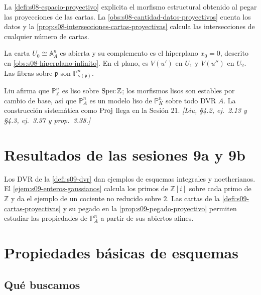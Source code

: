 La \cref{defi:s08-espacio-proyectivo} explicita el morfismo estructural obtenido al pegar las proyecciones de las cartas. La \cref{obs:s08-cantidad-datos-proyectivos} cuenta los datos y la \cref{prop:s08-intersecciones-cartas-proyectivas} calcula las intersecciones de cualquier número de cartas.

\begin{obs}
\label{obs:s09-proyectivo-modelo-liso}
La carta $U_0\cong\mathbb A^n_A$ es abierta y su complemento es el hiperplano $x_0=0$, descrito en \cref{obs:s08-hiperplano-infinito}. En el plano, es $V(u')$ en $U_1$ y $V(u'')$ en $U_2$. Las fibras sobre $\mathfrak p$ son $\mathbb P^n_{\kappa(\mathfrak p)}$.

Liu afirma que $\mathbb P^n_{\mathbb Z}$ es liso sobre $\operatorname{Spec}\mathbb Z$; los morfismos lisos son estables por cambio de base, así que $\mathbb P^n_A$ es un modelo liso de $\mathbb P^n_K$ sobre todo DVR $A$. La construcción sistemática como $\operatorname{Proj}$ llega en la Sesión 21. \emph{[Liu, \S4.2, ej.~2.13 y \S4.3, ej.~3.37 y prop.~3.38.]}
\end{obs}

\section{Resultados de las sesiones 9a y 9b}

Los DVR de la \cref{defi:s09-dvr} dan ejemplos de esquemas integrales y noetherianos. El \cref{ejem:s09-enteros-gaussianos} calcula los primos de $\mathbb Z[i]$ sobre cada primo de $\mathbb Z$ y da el ejemplo de un cociente no reducido sobre $2$. Las cartas de la \cref{defi:s09-cartas-proyectivas} y su pegado en la \cref{prop:s09-pegado-proyectivo} permiten estudiar las propiedades de $\mathbb P^n_A$ a partir de sus abiertos afines.

\section{Propiedades básicas de esquemas}
\subsection{Qué buscamos}

